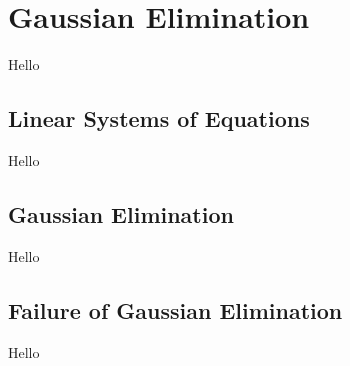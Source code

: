 \chapter{Gaussian Elimination}
Hello

\section{Linear Systems of Equations}
Hello

\section{Gaussian Elimination}
Hello

\section{Failure of Gaussian Elimination}
Hello
